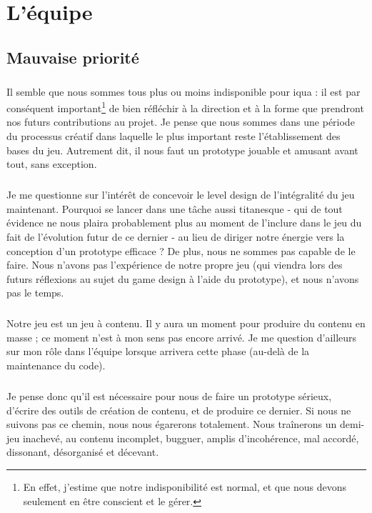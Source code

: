 \documentclass{report}
\begin{document}
\chapter{L'équipe}
\section{Mauvaise priorité}
\paragraph{}
Il semble que nous sommes tous plus ou moins indisponible pour iqua : il est par conséquent important\footnote{En effet, j'estime que notre indisponibilité est normal, et que nous devons seulement en être conscient et le gérer.} de bien réfléchir à la direction et à la forme que prendront nos futurs contributions au projet.
Je pense que nous sommes dans une période du processus créatif dans laquelle le plus important reste l'établissement des bases du jeu.
Autrement dit, il nous faut un prototype jouable et amusant avant tout, sans exception. 

\paragraph{}
Je me questionne sur l'intérêt de concevoir le level design de l'intégralité du jeu maintenant. Pourquoi se lancer dans une tâche aussi titanesque 
- qui de tout évidence ne nous plaira probablement plus au moment de l'inclure dans le jeu du fait de l'évolution futur de ce dernier - au lieu de diriger notre énergie 
vers la conception d'un prototype efficace ? De plus, nous ne sommes pas capable de le faire. Nous n'avons pas l'expérience de notre propre jeu (qui viendra lors des 
futurs réflexions au sujet du game design à l'aide du prototype), et nous n'avons pas le temps.

\paragraph{}
Notre jeu est un jeu à contenu. Il y aura un moment pour produire du contenu en masse ; ce moment n'est à mon sens pas encore arrivé. 
Je me question d'ailleurs sur mon rôle dans l'équipe lorsque arrivera cette phase (au-delà de la maintenance du code).

\paragraph{}
Je pense donc qu'il est nécessaire pour nous de faire un prototype sérieux, d'écrire des outils de création de contenu, et de produire ce dernier.
Si nous ne suivons pas ce chemin, nous nous égarerons totalement. Nous traînerons un demi-jeu inachevé, au contenu incomplet, bugguer, amplis d'incohérence, mal accordé,
dissonant, désorganisé et décevant.
\end{document}
